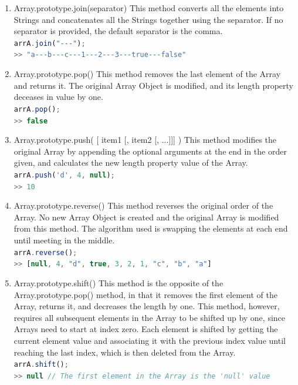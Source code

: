 \documentclass[a4paper,11pt,twoside]{report}
\def\jsinline{\lstinline[language=JavaScript, basicstyle=\small]}
\begin{document}
\begin{enumerate}
\item Array.prototype.join(separator) \newline
This method converts all the elements into Strings and concatenates all the Strings together using the separator. If no separator is provided, the default separator is the comma.\\
\jsinline|arrA.join("---");|\\
\jsinline|>> "a---b---c---1---2---3---true---false"|

\item Array.prototype.pop() \newline
This method removes the last element of the Array and returns it. The original Array Object is modified, and its length property deceases in value by one.\\
\jsinline|arrA.pop();|\\
\jsinline|>> false|

\item Array.prototype.push( [ item1 [, item2 [, ...]]] ) \newline
This method modifies the original Array by appending the optional arguments at the end in the order given, and calculates the new length property value of the Array.\\
\jsinline|arrA.push('d', 4, null);|\\
\jsinline|>> 10|

\item Array.prototype.reverse() \newline
This method reverses the original order of the Array. No new Array Object is created and the original Array is modified from this method. The algorithm used is swapping the elements at each end until meeting in the middle.\\
\jsinline|arrA.reverse();|\\
\jsinline|>> [null, 4, "d", true, 3, 2, 1, "c", "b", "a"]|

\item Array.prototype.shift() \newline
This method is the opposite of the Array.prototype.pop() method, in that it removes the first element of the Array, returns it, and decreases the length by one. This method, however, requires all subsequent elements in the Array to be shifted up by one, since Arrays need to start at index zero. Each element is shifted by getting the current element value and associating it with the previous index value until reaching the last index, which is then deleted from the Array.\\
\jsinline|arrA.shift();|\\
\jsinline|>> null // The first element in the Array is the 'null' value|


\end{enumerate}
\end{document}
